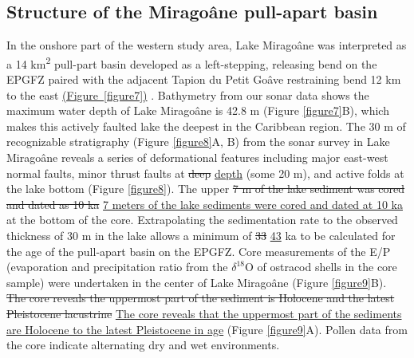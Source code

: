 \documentclass[linenumbers,draft]{agujournal}
\providecommand{\DIFdel}[1]{{\protect\color{red}\sout{#1}}}                      %
\providecommand{\DIFaddbegin}{} %
\providecommand{\DIFaddend}{} %
\providecommand{\DIFdelbegin}{} %
\providecommand{\DIFdelend}{} %
\begin{document}
\subsection{Structure of the Mirago\^ane pull-apart basin}
In the onshore part of the western study area, Lake Mirago\^ane was interpreted as a 14 km\textsuperscript{2} pull-part basin developed as a left-stepping, releasing bend on the EPGFZ paired with the adjacent Tapion du Petit Go\^ave restraining bend 12 km to the east \DIFaddbegin \ul{(Figure~{\ref{figure7}})} \DIFaddend \citep{cowgill2012interactive}. Bathymetry from our sonar data shows the maximum water depth of Lake Mirago\^ane is 42.8 m (Figure \ref{figure7}B), which makes this actively faulted lake the deepest \citep{higuera199910} in the Caribbean region. The 30 m of recognizable stratigraphy (Figure \ref{figure8}A, B) from the sonar survey in Lake Mirago\^ane reveals a series of deformational features including major east-west normal faults, minor thrust faults at \DIFdelbegin \DIFdel{deep }\DIFdelend \DIFaddbegin \ul{depth} \DIFaddend (some 20 m), and active folds at the lake bottom (Figure \ref{figure8}). The upper \DIFdelbegin \DIFdel{7 m of the lake sediment was cored and dated as 10 ka }\DIFdelend \DIFaddbegin \ul{7 meters of the lake sediments were cored and dated at 10 ka} \DIFaddend at the bottom of the core. Extrapolating the sedimentation rate to the observed thickness of 30 m in the lake allows a minimum of \DIFdelbegin \DIFdel{33 }\DIFdelend \DIFaddbegin \ul{43} \DIFaddend ka to be calculated for the age of the pull-apart basin on the EPGFZ. Core measurements of the E/P (evaporation and precipitation ratio from the $\delta^{18}$O of ostracod shells in the core sample) were undertaken \citep{higuera199910} in the center of Lake Mirago\^ane (Figure \ref{figure9}B). \DIFdelbegin \DIFdel{The core reveals the uppermost part of the sediment is Holocene and the latest Pleistocene lacustrine }\DIFdelend \DIFaddbegin \ul{The core reveals that the uppermost part of the sediments are Holocene to the latest Pleistocene in age} \DIFaddend (Figure \ref{figure9}A). Pollen data from the core indicate alternating dry and wet environments.
\end{document}
